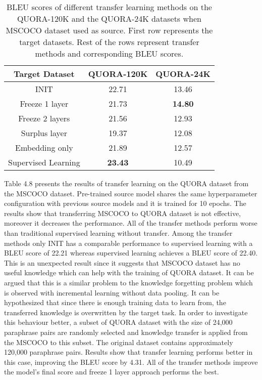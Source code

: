 \begin{table}[t]
\centering
\small
 \begin{tabular}{|c | c | c |} 
 \hline
 Target Dataset & QUORA-120K & QUORA-24K \\ [0.5ex] 
 \hline
  INIT & 22.71 & 13.46  \\ 
 \hline
  Freeze 1 layer & 21.73 & \textbf{14.80}  \\ 
 \hline
  Freeze 2 layers & 21.56 & 12.93  \\ 
 \hline
  Surplus layer & 19.37 & 12.08  \\ 
 \hline
  Embedding only & 21.89 & 12.57  \\ 
 \hline
  Supervised Learning & \textbf{23.43} & 10.49  \\ 
 \hline
\end{tabular}
\caption{BLEU scores of different transfer learning methods on the QUORA-120K and the QUORA-24K datasets when MSCOCO dataset used as source. First row represents the target datasets. Rest of the rows represent transfer methods and corresponding BLEU scores.}
\end{table}

Table 4.8 presents the results of transfer learning on the QUORA dataset from the MSCOCO dataset. Pre-trained source model shares the same hyperparameter configuration with previous source models and it is trained for 10 epochs. The results show that transferring MSCOCO to QUORA dataset is not effective, moreover it decreases the performance. All of the transfer methods perform worse than traditional supervised learning without transfer. Among the transfer methods only INIT has a comparable performance to supervised learning with a BLEU score of 22.21 whereas supervised learning achieves a BLEU score of 22.40. This is an unexpected result since it suggests that MSCOCO dataset has no useful knowledge which can help with the training of QUORA dataset. It can be argued that this is a similar problem to the knowledge forgetting problem which is observed with incremental learning without data pooling. It can be hypothesized that since there is enough training data to learn from, the transferred knowledge is overwritten by the target task. In order to investigate this behaviour better, a subset of QUORA dataset with the size of 24,000 paraphrase pairs are randomly selected and knowledge transfer is applied from the MSCOCO to this subset. The original dataset contains approximately 120,000 paraphrase pairs. Results show that transfer learning performs better in this case, improving the BLEU score by 4.31. All of the transfer methods improve the model's final score and freeze 1 layer approach performs the best.

